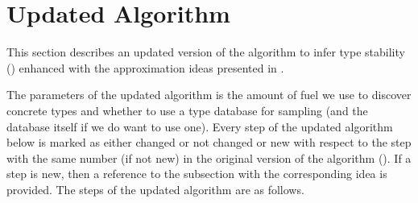 \section{Updated Algorithm} %
\label{sec:approx:algo-final}

This section describes an updated version of the algorithm to infer type
stability () enhanced with the approximation ideas
presented in .

The parameters of the updated algorithm is the amount of fuel we use to discover
concrete types and whether to use a type database for sampling (and the database
itself if we do want to use one).
Every step of the updated algorithm below is marked as either changed or not
changed or new with respect to the step with the same number (if not new) in the
original version of the algorithm ().
If a step is new, then a reference to the subsection with the corresponding idea is provided.
The steps of the updated algorithm are as follows.

